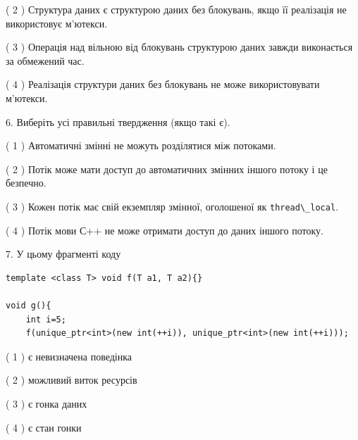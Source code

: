 \documentclass[12pt, ukrainian]{article}
\def\code#1{\Verb!#1!}
\begin{document}
\begin {large}
{( 2 ) Структура даних є структурою даних без блокувань, якщо її реалізація не використовує м’ютекси.%

( 3 ) Операція над вільною від блокувань структурою даних завжди виконається за обмежений час.%

( 4 ) Реалізація структури даних без блокувань не може використовувати м’ютекси.%
\newpage



\vspace{5mm}
6. Виберіть усі правильні твердження (якщо такі є).\par
\vspace{2mm}

( 1 ) Автоматичні змінні не можуть розділятися між потоками.%

( 2 ) Потік може мати доступ до автоматичних змінних іншого потоку і це безпечно.%

( 3 ) Кожен потік має свій екземпляр змінної, оголошеної як \code{thread\_local}.%

( 4 ) Потік мови С++ не може отримати доступ до даних іншого потоку.%


\vspace{5mm}
7. У цьому фрагменті коду
\begin{verbatim}
template <class T> void f(T a1, T a2){}

void g(){
    int i=5;
    f(unique_ptr<int>(new int(++i)), unique_ptr<int>(new int(++i)));
\end{verbatim}

( 1 ) є невизначена поведінка%

( 2 ) можливий виток ресурсів%

( 3 ) є гонка даних%

( 4 ) є стан гонки%
}
\end {large}
\end{document}
